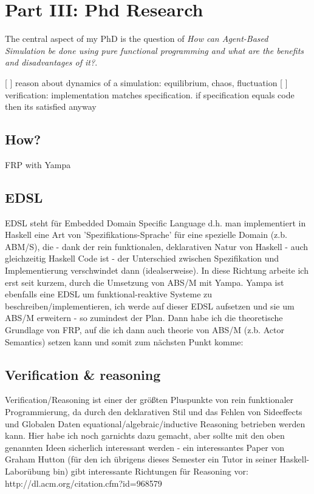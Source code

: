 \section{Part III: Phd Research} 
The central aspect of my PhD is the question of \textit{How can Agent-Based Simulation be done using pure functional programming and what are the benefits and disadvantages of it?}.

[ ] reason about dynamics of a simulation: equilibrium, chaos, fluctuation
[ ] verification: implementation matches specification. if specification equals code then its satisfied anyway


\subsection{How?}
FRP with Yampa

\subsection{EDSL}
EDSL steht für Embedded Domain Specific Language d.h. man implementiert in Haskell eine Art von 'Spezifikations-Sprache' für eine spezielle Domain (z.b. ABM/S), die - dank der rein funktionalen, deklarativen Natur von Haskell - auch gleichzeitig Haskell Code ist - der Unterschied zwischen Spezifikation und Implementierung verschwindet dann (idealserweise). In diese Richtung arbeite ich erst seit kurzem, durch die Umsetzung von ABS/M mit Yampa. Yampa ist ebenfalls eine EDSL um funktional-reaktive Systeme zu beschreiben/implementieren, ich werde auf dieser EDSL aufsetzen und sie um ABS/M erweitern - so zumindest der Plan. Dann habe ich die theoretische Grundlage von FRP, auf die ich dann auch theorie von ABS/M (z.b. Actor Semantics) setzen kann und somit zum nächsten Punkt komme:

\subsection{Verification \& reasoning}
Verification/Reasoning ist einer der größten Pluspunkte von rein funktionaler Programmierung, da durch den deklarativen Stil und das Fehlen von Sideeffects und Globalen Daten equational/algebraic/inductive Reasoning betrieben werden kann. Hier habe ich noch garnichts dazu gemacht, aber sollte mit den oben genannten Ideen sicherlich interessant werden - ein interessantes Paper von Graham Hutton (für den ich übrigens dieses Semester ein Tutor in seiner Haskell-Laborübung bin) gibt interessante Richtungen für Reasoning vor: http://dl.acm.org/citation.cfm?id=968579

